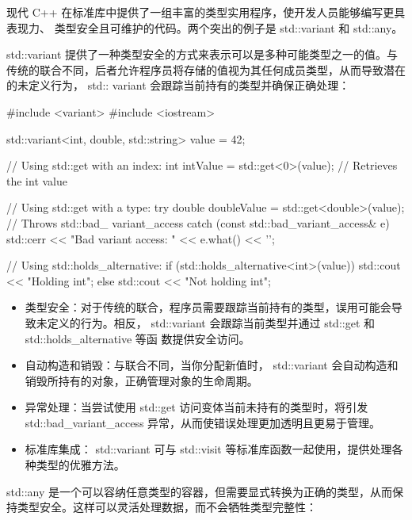 
现代 C++ 在标准库中提供了一组丰富的类型实用程序，使开发人员能够编写更具表现力、 类型安全且可维护的代码。两个突出的例子是 std::variant 和 std::any。


std::variant 提供了一种类型安全的方式来表示可以是多种可能类型之一的值。与传统的联合不同，后者允许程序员将存储的值视为其任何成员类型，从而导致潜在的未定义行为， std:: variant 会跟踪当前持有的类型并确保正确处理：

\begin{cpp}
#include <variant>
#include <iostream>

std::variant<int, double, std::string> value = 42;

// Using std::get with an index:
int intValue = std::get<0>(value); // Retrieves the int value

// Using std::get with a type:
try {
    double doubleValue = std::get<double>(value); // Throws std::bad_
    variant_access
} catch (const std::bad_variant_access& e) {
    std::cerr << "Bad variant access: " << e.what() << '\n';
}

// Using std::holds_alternative:
if (std::holds_alternative<int>(value)) {
    std::cout << "Holding int\n";
} else {
    std::cout << "Not holding int\n";
}
\end{cpp}


\begin{itemize}
\item
类型安全：对于传统的联合，程序员需要跟踪当前持有的类型，误用可能会导致未定义的行为。相反， std::variant 会跟踪当前类型并通过 std::get 和 std::holds\_alternative 等函
数提供安全访问。

\item
自动构造和销毁：与联合不同，当你分配新值时， std::variant 会自动构造和销毁所持有的对象，正确管理对象的生命周期。

\item
异常处理：当尝试使用 std::get 访问变体当前未持有的类型时，将引发std::bad\_variant\_access 异常，从而使错误处理更加透明且更易于管理。

\item
标准库集成： std::variant 可与 std::visit 等标准库函数一起使用，提供处理各种类型的优雅方法。
\end{itemize}


std::any 是一个可以容纳任意类型的容器，但需要显式转换为正确的类型，从而保持类型安全。这样可以灵活处理数据，而不会牺牲类型完整性：

